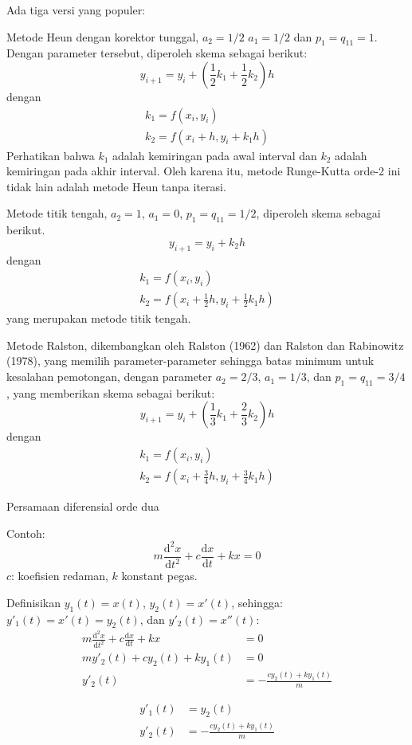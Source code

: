 Ada tiga versi yang populer:

Metode Heun dengan korektor tunggal, $a_2 = 1/2$
$a_1 = 1/2$ dan $p_1 = q_{11} = 1$. Dengan parameter tersebut, diperoleh skema
sebagai berikut:
\begin{equation*}
y_{i+1} = y_{i} + \left(
\frac{1}{2}k_1 + \frac{1}{2}k_2
\right)h
\end{equation*}
dengan
\begin{align*}
k_1 = f(x_i, y_i) \\
k_2 = f(x_i + h, y_i + k_1 h)
\end{align*}
Perhatikan bahwa $k_1$ adalah kemiringan pada awal interval dan $k_2$ adalah
kemiringan pada akhir interval. Oleh karena itu, metode Runge-Kutta orde-2 ini
tidak lain adalah metode Heun tanpa iterasi.


Metode titik tengah, $a_2 = 1$, $a_1 = 0$, $p_1 = q_{11} = 1/2$, diperoleh
skema sebagai berikut.
\begin{equation*}
y_{i+1} = y_i + k_2 h
\end{equation*}
dengan
\begin{align*}
k_1 = f(x_i, y_i) \\
k_2 = f\left( x_i + \frac{1}{2}h, y_i + \frac{1}{2} k_1 h \right)
\end{align*}
yang merupakan metode titik tengah.

Metode Ralston, dikembangkan oleh Ralston (1962) dan Ralston dan Rabinowitz (1978),
yang memilih parameter-parameter sehingga batas minimum untuk kesalahan pemotongan,
dengan parameter $a_2 = 2/3$, $a_1 = 1/3$, dan $p_1 = q_{11} = 3/4$, yang
memberikan skema sebagai berikut:
\begin{equation*}
y_{i+1} = y_i + \left( \frac{1}{3}k_1 + \frac{2}{3}k_2 \right) h
\end{equation*}
dengan
\begin{align*}
k_1 = f(x_i, y_i) \\
k_2 = f\left( x_i + \frac{3}{4}h, y_i + \frac{3}{4}k_1 h \right)
\end{align*}





Persamaan diferensial orde dua

Contoh:
\begin{equation*}
m \frac{\mathrm{d}^2 x}{\mathrm{d}t^2} + c \frac{\mathrm{d}x}{\mathrm{d}t} + kx = 0
\end{equation*}
$c$: koefisien redaman, $k$ konstant pegas.

Definisikan $y_{1}(t) = x(t)$, $y_{2}(t) = x'(t)$, sehingga:
$y'_{1}(t) = x'(t) = y_{2}(t)$, dan
$y'_{2}(t) = x''(t)$:
\begin{align*}
m \frac{\mathrm{d}^2 x}{\mathrm{d}t^2} + c \frac{\mathrm{d}x}{\mathrm{d}t} + kx & = 0 \\
m y'_{2}(t) + c y_{2}(t) + k y_{1}(t) & = 0 \\
y'_{2}(t) & = -\frac{c y_{2}(t) + k y_{1}(t)}{m}
\end{align*}

\begin{align*}
y'_{1}(t) & = y_{2}(t) \\
y'_{2}(t) & = -\frac{c y_{2}(t) + k y_{1}(t)}{m}
\end{align*}
